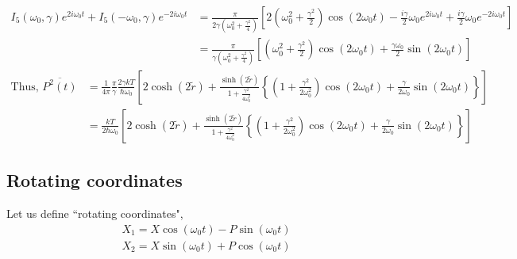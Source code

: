 \documentclass[12pt, twoside]{article}
\begin{document}
$\begin{aligned}
I_5(\omega_0,\gamma)e^{2i\omega_0 t}+I_5(-\omega_0,\gamma)e^{-2i\omega_0 t} &= \frac { \pi } { 2\gamma \left( \omega _ { 0 } ^ { 2 } + \frac { \gamma ^ { 2 } } { 4 } \right) } \left[2 \left( \omega _ { 0 } ^ { 2 } + \frac { \gamma ^ { 2 } } { 2 } \right) \cos \left( 2 \omega _ { 0 } t \right) - \frac { i\gamma } { 2 } \omega _ { 0 } e ^ { 2 i \omega _ { 0 } t } + \frac { i\gamma } { 2 } \omega _ { 0 } e ^ {-2 i \omega _ { 0 } t }\right] 
\\&= \frac { \pi } { \gamma \left( \omega _ { 0 } ^ { 2 } + \frac { \gamma ^ { 2 } } { 4 } \right) } \left[ \left( \omega _ { 0 } ^ { 2 } + \frac { \gamma ^ { 2 } } { 2 } \right) \cos \left( 2 \omega _ { 0 } t \right)  + \frac { \gamma \omega _ { 0 } } { 2 } \sin \left( 2 \omega _ { 0 } t \right) \right] 
\end{aligned}$
\begin{equation}\begin{aligned}\label{eq:p_average} \text{Thus, }
\overline{P ^ { 2 } ( t )} & = \frac{1}{4\pi} \frac{\pi}{\gamma} \frac{2\gamma k T}{\hbar \omega_0} \left[2\cosh(2\tilde{r}) + \frac{\sinh(2\tilde{r})}{1 + \frac{\gamma^2}{4\omega_0 ^2}}\left\{(1+\frac{\gamma^2}{2\omega_0 ^2})\cos(2\omega_0 t) + \frac{\gamma}{2 \omega_0}\sin(2\omega_0 t)\right\}\right] \\& = \frac{kT}{2 \hbar \omega_0} \left[2\cosh(2\tilde{r}) + \frac{\sinh(2\tilde{r})}{1 + \frac{\gamma^2}{4\omega_0 ^2}}\left\{(1+\frac{\gamma^2}{2\omega_0 ^2})\cos(2\omega_0 t) + \frac{\gamma}{2 \omega_0}\sin(2\omega_0 t)\right\}\right]
\end{aligned}\end{equation}
\subsection{Rotating coordinates}\label{rotating_coordinates}
Let us define ``rotating coordinates", \begin{equation}\begin{array} { l } { X _ { 1 } = X \cos \left( \omega _ { 0 } t \right) - P \sin ( \omega_0  t ) } \\ { X _ { 2 } = X \sin ( \omega_0  t ) + P \cos ( \omega_0  t ) } \end{array}\end{equation}
\end{document}
